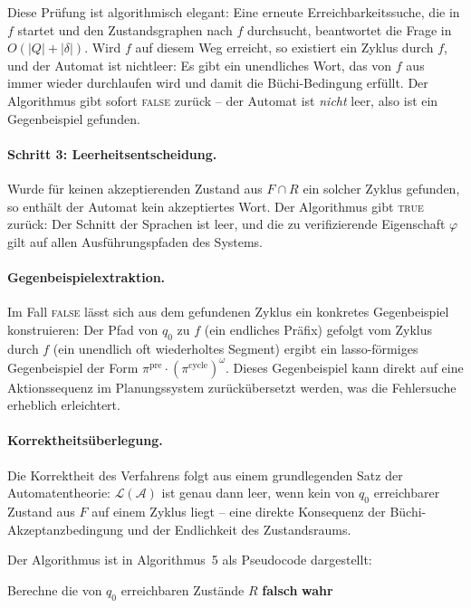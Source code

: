 ﻿\documentclass[a4paper,12pt]{article}
\theoremstyle{definition}
\begin{document}
Diese Prüfung ist algorithmisch elegant: Eine erneute Erreichbarkeitssuche, die in $f$ startet und den Zustandsgraphen nach $f$ durchsucht, beantwortet die Frage in $O(|Q| + |\delta|)$. Wird $f$ auf diesem Weg erreicht, so existiert ein Zyklus durch $f$, und der Automat ist nichtleer: Es gibt ein unendliches Wort, das von $f$ aus immer wieder durchlaufen wird und damit die Büchi-Bedingung erfüllt. Der Algorithmus gibt sofort \textsc{false} zurück -- der Automat ist \emph{nicht} leer, also ist ein Gegenbeispiel gefunden.

\paragraph*{Schritt 3: Leerheitsentscheidung.}
Wurde für keinen akzeptierenden Zustand aus $F \cap R$ ein solcher Zyklus gefunden, so enthält der Automat kein akzeptiertes Wort. Der Algorithmus gibt \textsc{true} zurück: Der Schnitt der Sprachen ist leer, und die zu verifizierende Eigenschaft $\varphi$ gilt auf allen Ausführungspfaden des Systems.

\paragraph*{Gegenbeispielextraktion.}
Im Fall \textsc{false} lässt sich aus dem gefundenen Zyklus ein konkretes Gegenbeispiel konstruieren: Der Pfad von $q_0$ zu $f$ (ein endliches Präfix) gefolgt vom Zyklus durch $f$ (ein unendlich oft wiederholtes Segment) ergibt ein lasso-förmiges Gegenbeispiel der Form $\pi^{\text{pre}} \cdot (\pi^{\text{cycle}})^\omega$. Dieses Gegenbeispiel kann direkt auf eine Aktionssequenz im Planungssystem zurückübersetzt werden, was die Fehlersuche erheblich erleichtert.

\paragraph*{Korrektheitsüberlegung.}
Die Korrektheit des Verfahrens folgt aus einem grundlegenden Satz der Automaten\-theorie: $\mathcal{L}(\mathcal{A})$ ist genau dann leer, wenn kein von $q_0$ erreichbarer Zustand aus $F$ auf einem Zyklus liegt -- eine direkte Konsequenz der Büchi-Akzeptanzbedingung und der Endlichkeit des Zustandsraums.

Der Algorithmus ist in Algorithmus~5 als Pseudocode dargestellt:

\begin{algorithm}[H]
	\caption{Büchi-Leerheitstest}
	\begin{algorithmic}[1]
		\State Berechne die von $q_0$ erreichbaren Zustände $R$ 
				\State \Return \textbf{falsch} 
			\EndeWenn
		\EndeFuer
		\State \Return \textbf{wahr} 
		\EndProzedur
	\end{algorithmic}
\end{algorithm}
\end{document}
